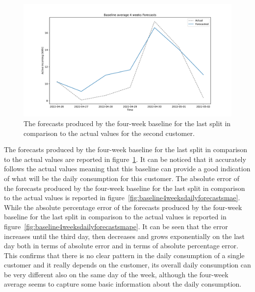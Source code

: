 \begin{figure}[H]
\centering
\includegraphics[width=1\textwidth]{images/baseline/baseline_average_4_weeks_daily_aggregated}
\caption{The forecasts produced by the four-week baseline for the last split in comparison to the actual values for the second customer.}
\label{fig:baseline4weeksdailyforecasts}
\end{figure}

The forecasts produced by the four-week baseline for the last split in comparison to the actual values are reported in figure~\ref{fig:baseline4weeksdailyforecasts}.
It can be noticed that it accurately follows the actual values meaning that this baseline can provide a good indication of what will be the daily consumption for this customer.
The absolute error of the forecasts produced by the four-week baseline for the last split in comparison to the actual values is reported in figure~\ref{fig:baseline4weeksdailyforecastsmae}.
While the absolute percentage error of the forecasts produced by the four-week baseline for the last split in comparison to the actual values is reported in figure~\ref{fig:baseline4weeksdailyforecastsmape}.
It can be seen that the error increases until the third day, then decreases and grows exponentially on the last day both in terms of absolute error and in terms of absolute percentage error.
This confirms that there is no clear pattern in the daily consumption of a single customer and it really depends on the customer, its overall daily consumption can be very different also on the same day of the week, although the four-week average seems to capture some basic information about the daily consumption.

